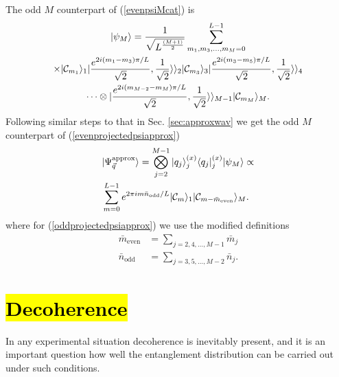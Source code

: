 \documentclass[%
  prx,%
  twocolumn,%
  preprintnumbers,%
  amsmath,%
  amssymb,%
  superscriptaddress%
]{revtex4}
\begin{document}
{The odd $ M $ counterpart of (\ref{evenpsiMcat}) is
%
\begin{multline}
| \psi_M \rangle=\frac{1}{\sqrt{L^{\frac{(M+1)}{2}}}}\sum_{m_1,m_3,\ldots,m_M=0}^{L-1} \\
\times | {\cal C}_{m_1}  \rangle_1  |\frac{e^{2 i(m_{1}-m_{3})\pi/L }}{\sqrt{2}},\frac{1}{\sqrt{2}}\rangle\rangle_2 | {\cal C}_{m_3} \rangle_3
|\frac{e^{2 i(m_{3}-m_{5})\pi/L }}{\sqrt{2}},\frac{1}{\sqrt{2}}\rangle\rangle_4  \\
\dots \otimes |\frac{e^{2 i(m_{M-2}-m_{M})\pi/L }}{\sqrt{2}},\frac{1}{\sqrt{2}}\rangle\rangle_{M-1} | {\cal C}_{m_{M}}  \rangle_{M} .
\label{oddpsiMcat}
\end{multline}
%
Following similar steps to that in Sec. \ref{sec:approxwav} we get the odd $ M $ counterpart of (\ref{evenprojectedpsiapprox})
%
\begin{align}
& | \Psi_{\vec{q}}^{\text{approx}} \rangle =  \bigotimes_{j=2}^{M-1}  |q_j \rangle_j^{(x)} \langle q_j |_j^{(x)}  |\psi_M \rangle \propto \nonumber \\
& \sum_{m=0}^{L-1} e^{2 \pi i m \bar{n}_{\text{odd}}/L } | {\cal C}_{m}  \rangle_1 | {\cal C}_{m - \bar{m}_{\text{even}}}  \rangle_M  .  \label{oddprojectedpsiapprox}
\end{align}
%
where for (\ref{oddprojectedpsiapprox}) we use the modified definitions
%
\begin{align}
\bar{m}_\text{even} & =
\sum_{j=2,4, \dots, M-1} \bar{m}_j  \nonumber \\
\bar{n}_{\text{odd}} & = \sum_{j=3,5,\dots, M-2} \bar{n}_j  .
\end{align}




\section{\hl{Decoherence}}
\label{sec:decoherence}

In any experimental situation decoherence is inevitably present, and it is an important
question how well the entanglement distribution can be carried out under such conditions.

}
\end{document}
